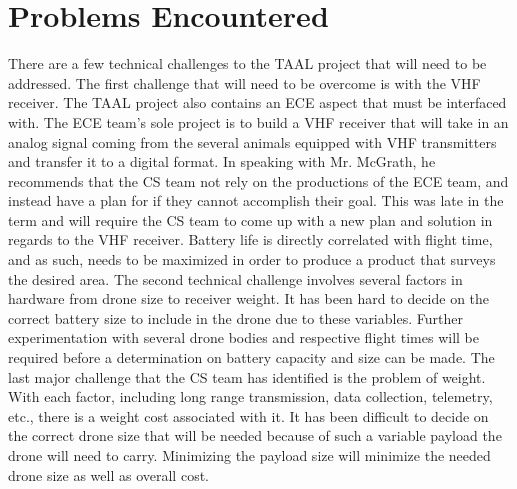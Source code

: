 \documentclass[onecolumn, draftclsnofoot,10pt, compsoc]{IEEEtran}
\begin{document}
\section{Problems Encountered}
There are a few technical challenges to the TAAL project that will need to be addressed.
The first challenge that will need to be overcome is with the VHF receiver. The TAAL project also contains an ECE aspect that must be interfaced with. The ECE team's sole project is to build a VHF receiver that will take in an analog signal coming from the several animals equipped with VHF transmitters and transfer it to a digital format. In speaking with Mr. McGrath, he recommends that the CS team not rely on the productions of the ECE team, and instead have a plan for if they cannot accomplish their goal. This was late in the term and will require the CS team to come up with a new plan and solution in regards to the VHF receiver.
\newline\newline
Battery life is directly correlated with flight time, and as such, needs to be maximized in order to produce a product that surveys the desired area. The second technical challenge involves several factors in hardware from drone size to receiver weight. It has been hard to decide on the correct battery size to include in the drone due to these variables. Further experimentation with several drone bodies and respective flight times will be required before a determination on battery capacity and size can be made.
\newline\newline
The last major challenge that the CS team has identified is the problem of weight. With each factor, including long range transmission, data collection, telemetry, etc., there is a weight cost associated with it. It has been difficult to decide on the correct drone size that will be needed because of such a variable payload the drone will need to carry. Minimizing the payload size will  minimize the needed drone size as well as overall cost.
\end{document}
